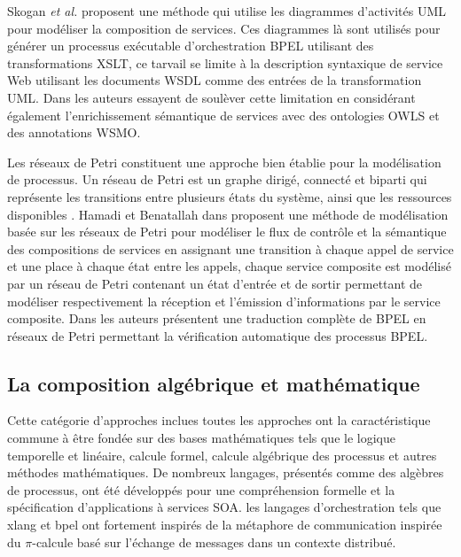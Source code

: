  Skogan \textit{et al.}  \cite{skogan2004web} proposent une méthode
  qui utilise les diagrammes d'activités \textsc{UML} pour modéliser
  la composition de services. Ces diagrammes là sont utilisés pour
  générer un processus exécutable d'orchestration \textsc{BPEL}
  utilisant des transformations \textsc{XSLT}, ce tarvail se limite à
  la description syntaxique de service Web utilisant les documents
  \textsc{WSDL} comme des entrées de la transformation
  \textsc{UML}. Dans \cite{gronmo2005model} les auteurs essayent de
  soulèver cette limitation en considérant également l'enrichissement
  sémantique de services avec des ontologies \textsc{OWLS} et des
  annotations \textsc{WSMO}.\medskip

  Les réseaux de Petri \cite{petri1962kommunikation} constituent une
  approche bien établie pour la modélisation de processus. Un réseau
  de Petri est un graphe dirigé, connecté et biparti qui représente
  les transitions entre plusieurs états du système, ainsi que les
  ressources disponibles \cite{dumez2010approche}. Hamadi et
  Benatallah dans \cite{hamadi2003petri} proposent une méthode de
  modélisation basée sur les réseaux de Petri pour modéliser le flux
  de contrôle et la sémantique des compositions de services en
  assignant une transition à chaque appel de service et une place à
  chaque état entre les appels, chaque service composite est modélisé
  par un réseau de Petri contenant un état d'entrée et de sortir
  permettant de modéliser respectivement la réception et l'émission
  d'informations par le service composite. Dans
  \cite{ouyang2007formal} les auteurs présentent une traduction
  complète de \textsc{BPEL} en réseaux de Petri permettant la
  vérification automatique des processus \textsc{BPEL}.

  \subsection{La composition algébrique et mathématique}
  \label{sec:les-apprc-math}
  Cette catégorie d'approches inclues toutes les approches ont la
  caractéristique commune à être fondée sur des bases mathématiques
  tels que le logique temporelle et linéaire, calcule formel, calcule
  algébrique des processus et autres méthodes mathématiques. De
  nombreux langages, présentés comme des algèbres de processus, ont
  été développés pour une compréhension formelle et la spécification
  d'applications à services \textsc{SOA}. les langages d'orchestration
  tels que \acrshort{xlang} et \acrshort{bpel} ont fortement inspirés
  de la métaphore de communication inspirée du $\pi$-calcule basé sur
  l'échange de messages dans un contexte distribué.\medskip

